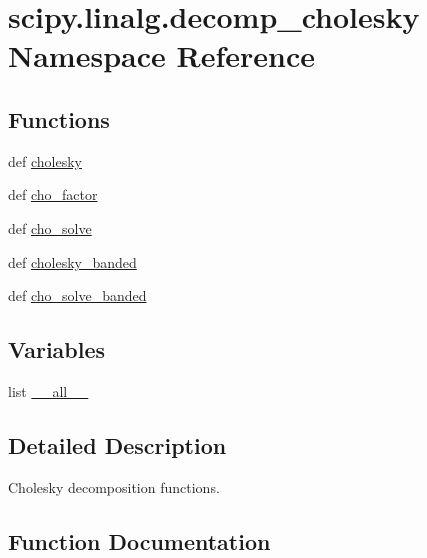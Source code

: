 \hypertarget{namespacescipy_1_1linalg_1_1decomp__cholesky}{}\section{scipy.\+linalg.\+decomp\+\_\+cholesky Namespace Reference}
\label{namespacescipy_1_1linalg_1_1decomp__cholesky}
\subsection*{Functions}
\begin{DoxyCompactItemize}
\item 
def \hyperlink{namespacescipy_1_1linalg_1_1decomp__cholesky_a42c033ccdcc839c1fc2d6155fad28964}{cholesky}
\item 
def \hyperlink{namespacescipy_1_1linalg_1_1decomp__cholesky_ad8c8e4e6d92073854ca8762ee850469e}{cho\+\_\+factor}
\item 
def \hyperlink{namespacescipy_1_1linalg_1_1decomp__cholesky_a218ccb379e88decdd8d792e31c4f6c0c}{cho\+\_\+solve}
\item 
def \hyperlink{namespacescipy_1_1linalg_1_1decomp__cholesky_a2fe29bd84489a95e75c101d8cf2f3642}{cholesky\+\_\+banded}
\item 
def \hyperlink{namespacescipy_1_1linalg_1_1decomp__cholesky_a4eb74808b81096382d17676dd722b34a}{cho\+\_\+solve\+\_\+banded}
\end{DoxyCompactItemize}
\subsection*{Variables}
\begin{DoxyCompactItemize}
\item 
list \hyperlink{namespacescipy_1_1linalg_1_1decomp__cholesky_aefa0f31ab2cb61c54454425821b04ff9}{\+\_\+\+\_\+all\+\_\+\+\_\+}
\end{DoxyCompactItemize}


\subsection{Detailed Description}
\begin{DoxyVerb}Cholesky decomposition functions.\end{DoxyVerb}
 

\subsection{Function Documentation}
\hypertarget{namespacescipy_1_1linalg_1_1decomp__cholesky_ad8c8e4e6d92073854ca8762ee850469e}{}
